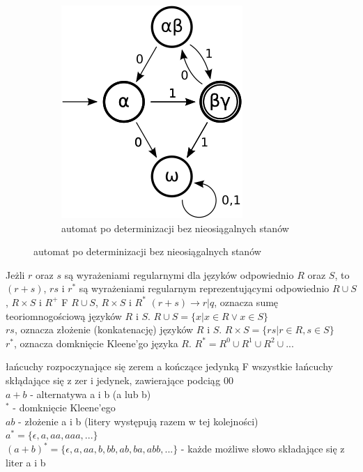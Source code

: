 {\begin{figure}[h]
		\begin{subfigure}[b]{0.3\textwidth}
			\includegraphics[width=\textwidth]{18/daut2}
			\caption{automat po determinizacji bez nieosiągalnych stanów}
			\label{c}
		\end{subfigure}
	\end{figure}
}

\answer
{Jeżli $r$ oraz $s$ są wyrażeniami regularnymi dla języków odpowiednio $R$ oraz $S$, to $(r+s)$, $rs$ i $r^*$ są wyrażeniami regularnym reprezentującymi odpowiednio}
{ $R \cup S$, $R \times S$ i $R^+$}
{F}
{$R \cup S$, $R \times S$ i $R^*$}
{
	$(r+s) \rightarrow r | q$, oznacza sumę teoriomnogościową języków $R$ i $S$. $R \cup S = \{x | x \in R \lor x \in S\}$ \\
	$rs$, oznacza złożenie (konkatenację) języków $R$ i $S$. $R \times S = \{rs | r \in R, s \in S\}$ \\
	$r^*$, oznacza domknięcie Kleene'go języka $R$. $R^* = R^0 \cup R^1 \cup R^2 \cup ...$  
}

{łańcuchy rozpoczynające się zerem a kończące jedynką}
{F}
{wszystkie łańcuchy skłądające się z zer i jedynek, zawierające podciąg $00$}
{\\$a + b$ - alternatywa a i b (a lub b)\\
	$^*$ - domknięcie Kleene'ego\\ 
	$ab$ - złożenie a i b (litery występują razem w tej kolejności)\\
	$a^* = \{\epsilon, a, aa, aaa, ...\}$\\
	$(a + b)^* = \{\epsilon, a, aa, b, bb, ab, ba, abb, ...\}$ - każde możliwe słowo składające się z liter a i b}

